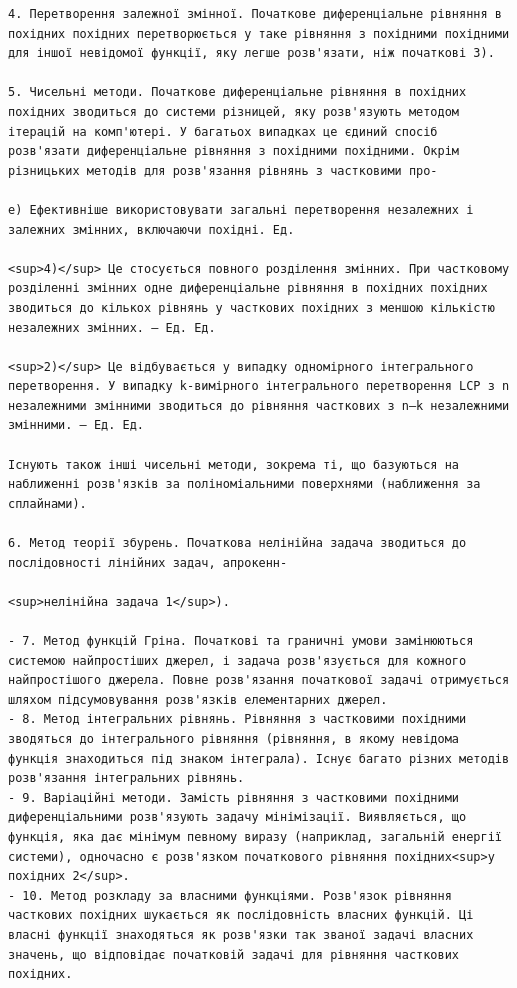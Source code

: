 \documentclass[
  ukrainian,
]{article}
\begin{document}
\begin{verbatim}
4. Перетворення залежної змінної. Початкове диференціальне рівняння в похідних похідних перетворюється у таке рівняння з похідними похідними для іншої невідомої функції, яку легше розв'язати, ніж початкові 3).

5. Чисельні методи. Початкове диференціальне рівняння в похідних похідних зводиться до системи різницей, яку розв'язують методом ітерацій на комп'ютері. У багатьох випадках це єдиний спосіб розв'язати диференціальне рівняння з похідними похідними. Окрім різницьких методів для розв'язання рівнянь з частковими про-

e) Ефективніше використовувати загальні перетворення незалежних і залежних змінних, включаючи похідні. Ед.

<sup>4)</sup> Це стосується повного розділення змінних. При частковому розділенні змінних одне диференціальне рівняння в похідних похідних зводиться до кількох рівнянь у часткових похідних з меншою кількістю незалежних змінних. — Ед. Ед.

<sup>2)</sup> Це відбувається у випадку одномірного інтегрального перетворення. У випадку k-вимірного інтегрального перетворення LCP з n незалежними змінними зводиться до рівняння часткових з n—k незалежними змінними. — Ед. Ед.

Існують також інші чисельні методи, зокрема ті, що базуються на наближенні розв'язків за поліноміальними поверхнями (наближення за сплайнами).

6. Метод теорії збурень. Початкова нелінійна задача зводиться до послідовності лінійних задач, апрокенн-

<sup>нелінійна задача 1</sup>).

- 7. Метод функцій Гріна. Початкові та граничні умови замінюються системою найпростіших джерел, і задача розв'язується для кожного найпростішого джерела. Повне розв'язання початкової задачі отримується шляхом підсумовування розв'язків елементарних джерел.
- 8. Метод інтегральних рівнянь. Рівняння з частковими похідними зводяться до інтегрального рівняння (рівняння, в якому невідома функція знаходиться під знаком інтеграла). Існує багато різних методів розв'язання інтегральних рівнянь.
- 9. Варіаційні методи. Замість рівняння з частковими похідними диференціальними розв'язують задачу мінімізації. Виявляється, що функція, яка дає мінімум певному виразу (наприклад, загальній енергії системи), одночасно є розв'язком початкового рівняння похідних<sup>у похідних 2</sup>.
- 10. Метод розкладу за власними функціями. Розв'язок рівняння часткових похідних шукається як послідовність власних функцій. Ці власні функції знаходяться як розв'язки так званої задачі власних значень, що відповідає початковій задачі для рівняння часткових похідних.


\end{verbatim}
\end{document}
